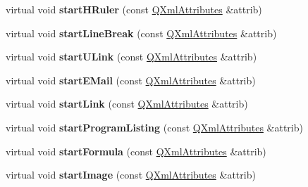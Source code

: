 \begin{DoxyCompactItemize}
\item 
\mbox{\label{class_paragraph_handler_a77c899c5290d9d3eef030da09ef27fe4}} 
virtual void {\bfseries start\+H\+Ruler} (const \mbox{\hyperlink{class_q_xml_attributes}{Q\+Xml\+Attributes}} \&attrib)
\item 
\mbox{\label{class_paragraph_handler_ab20027a81543f080c559f171d1af8ca5}} 
virtual void {\bfseries start\+Line\+Break} (const \mbox{\hyperlink{class_q_xml_attributes}{Q\+Xml\+Attributes}} \&attrib)
\item 
\mbox{\label{class_paragraph_handler_ab88b088c18e1654a066142209da5b8ea}} 
virtual void {\bfseries start\+U\+Link} (const \mbox{\hyperlink{class_q_xml_attributes}{Q\+Xml\+Attributes}} \&attrib)
\item 
\mbox{\label{class_paragraph_handler_aef926a76ff1b15d0591c1691c69b5a14}} 
virtual void {\bfseries start\+E\+Mail} (const \mbox{\hyperlink{class_q_xml_attributes}{Q\+Xml\+Attributes}} \&attrib)
\item 
\mbox{\label{class_paragraph_handler_adcda481db7de5dad9be7275f5500b878}} 
virtual void {\bfseries start\+Link} (const \mbox{\hyperlink{class_q_xml_attributes}{Q\+Xml\+Attributes}} \&attrib)
\item 
\mbox{\label{class_paragraph_handler_aa791184d5d64430a5f1a5c0b1019e977}} 
virtual void {\bfseries start\+Program\+Listing} (const \mbox{\hyperlink{class_q_xml_attributes}{Q\+Xml\+Attributes}} \&attrib)
\item 
\mbox{\label{class_paragraph_handler_acbd74ee40002dfc8c8a9ba67117e466a}} 
virtual void {\bfseries start\+Formula} (const \mbox{\hyperlink{class_q_xml_attributes}{Q\+Xml\+Attributes}} \&attrib)
\item 
\mbox{\label{class_paragraph_handler_a34fad9a6a54b0aabc57944e543f57adb}} 
virtual void {\bfseries start\+Image} (const \mbox{\hyperlink{class_q_xml_attributes}{Q\+Xml\+Attributes}} \&attrib)
\item 
\mbox{\label{class_paragraph_handler_a999f9f2ab75be864bd050f1e2254f7e9}} 

\end{DoxyCompactItemize}
